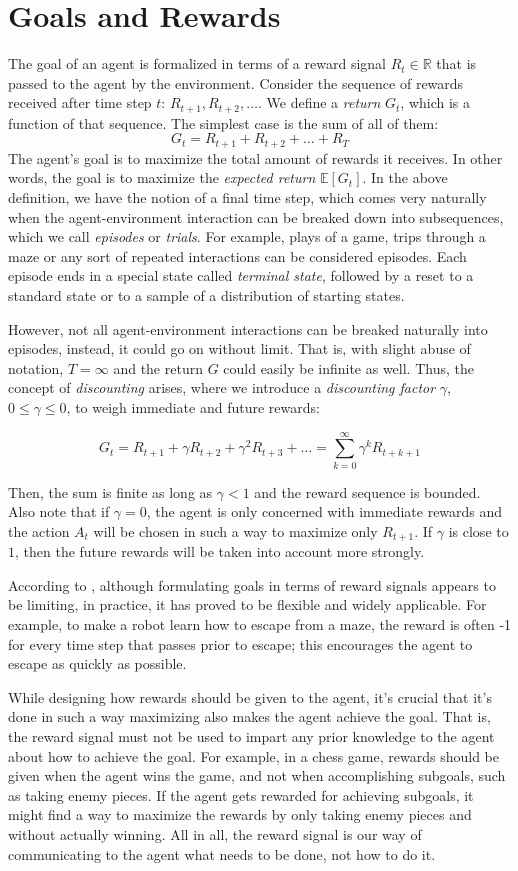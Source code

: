 \section{Goals and Rewards}
The goal of an agent is formalized in terms of a reward signal $R_t \in \mathbb{R}$ that is passed to the agent by the environment. Consider the sequence of rewards received after time step $t$: $R_{t+1}, R_{t+2}, \dots$. We define a \textit{return} $G_t$, which is a function of that sequence. The simplest case is the sum of all of them:
\[
    G_t = R_{t+1} + R_{t+2} + \dots + R_T
\]
The agent's goal is to maximize the total amount of rewards it receives. In other words, the goal is to maximize the \textit{expected return} $\mathbb{E}[G_t]$. In the above definition, we have the notion of a final time step, which comes very naturally when the agent-environment interaction can be breaked down into subsequences, which we call \textit{episodes} or \textit{trials}. For example, plays of a game, trips through a maze or any sort of repeated interactions can be considered episodes. Each episode ends in a special state called \textit{terminal state}, followed by a reset to a standard state or to a sample of a distribution of starting states.

However, not all agent-environment interactions can be breaked naturally into episodes, instead, it could go on without limit. That is, with slight abuse of notation, $T = \infty$ and the return $G$ could easily be infinite as well. Thus, the concept of \textit{discounting} arises, where we introduce a \textit{discounting factor} $\gamma$, $0 \leq \gamma \leq 0$, to weigh immediate and future rewards:

\[
    G_t = R_{t+1} + \gamma R_{t+2} + \gamma^2 R_{t+3} + \dots = \sum_{k=0}^{\infty}\gamma^k R_{t+k+1}
\]

Then, the sum is finite as long as $\gamma < 1$ and the reward sequence is bounded. Also note that if $\gamma = 0$, the agent is only concerned with immediate rewards and the action $A_t$ will be chosen in such a way to maximize only $R_{t+1}$. If $\gamma$ is close to $1$, then the future rewards will be taken into account more strongly.

According to \cite{suttonbarto}, although formulating goals in terms of reward signals appears to be limiting, in practice, it has proved to be flexible and widely applicable. For example, to make a robot learn how to escape from a maze, the reward is often -1 for every time
step that passes prior to escape; this encourages the agent to escape as quickly as possible.

While designing how rewards should be given to the agent, it's crucial that it's done in such a way maximizing also makes the agent achieve the goal. That is, the reward signal must not be used to impart any prior knowledge to the agent about how to achieve the goal. For example, in a chess game, rewards should be given when the agent wins the game, and not when accomplishing subgoals, such as taking enemy pieces. If the agent gets rewarded for achieving subgoals, it might find a way to maximize the rewards by only taking enemy pieces and without actually winning. All in all, the reward signal is our way of communicating to the agent what needs to be done, not how to do it. 